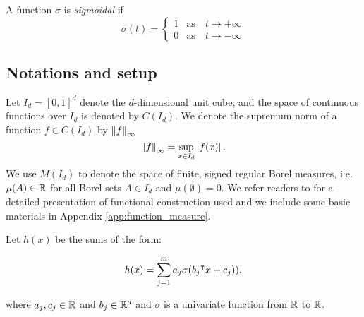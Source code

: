 

\begin{definition}\label{def:sigmoidal}
    A function $\sigma$ is \textit{sigmoidal} if
    \begin{equation}
        \sigma(t) =
        \begin{cases}
            1 & \text{as} \quad t \to +\infty \\
            0 & \text{as} \quad t \to -\infty
        \end{cases}
    \end{equation}
\end{definition}

\subsection*{Notations and setup}

Let $I_d = [0,1]^d$ denote the $d$-dimensional unit cube, and the space of
continuous functions over $I_d$ is denoted by $C(I_d)$. We denote the supremum
norm of a function $f \in C(I_d)$ by $\left\| f \right\|_{\infty}$ 
\begin{equation}
    \left\| f \right\|_{\infty} = \sup_{x\in I_d} \left| f(x) \right|.
\end{equation}
We use $M(I_d)$ to denote the space of finite, signed regular Borel measures,
i.e. $\mu(A) \in \mathbb{R}$ for all Borel sets $A \in I_d$ and $\mu(\emptyset)= 0$. We
refer readers to \cite{rudinFunctionalAnalysis1991,
rudinRealComplexAnalysis1987} for a detailed presentation of functional
construction used and we include some basic materials in Appendix
\ref{app:function_measure}.

Let $h(x)$ be the sums of the form:

\begin{equation}
    \label{eq:sum_sigma}
    h(x) = \sum_{j=1}^m a_j \sigma(b_j{}^{\intercal} x + c_j)),
\end{equation}

where $a_j, c_j \in \mathbb{R}$ and $b_j \in \mathbb{R}^d$ and $\sigma$ is a univariate function
from $\mathbb{R}$ to $\mathbb{R}$.
 
